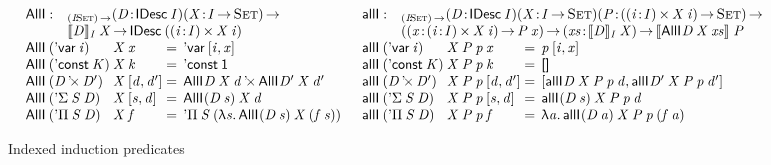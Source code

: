 \begin{figure*}

\[
\begin{array}{ll}
\stk{
\begin{array}{@{}ll}
\SYMBAllI : & _{\PI{\V{I}}{\Set}}
              \PITEL{\V{D}}{\IDesc{\V{I}}}
              \PI{\V{X}}{\V{I} \To \Set} \\
            & \idescop{\V{D}}{\V{I}}{\V{X}} \To
              \IDesc{(\SIGMA{\V{i}}{\V{I}}{\V{X}\: \V{i}})}
\end{array} \\
\begin{array}{@{}l@{}l@{\:=\:\:}l}
\AllI{\:}{(\DVar{\V{i}})}{& \V{X}}{\V{x}} &
    \DVar{\pair{\V{i}}{\V{x}}{}} \\
\AllI{\:}{(\DConst{\V{K}})}{& \V{X}}{\V{k}} &
    \DConst{\Unit} \\
\AllI{\:}{(\DProd{\V{D}}{\V{D'}})}{& \V{X}}{\pair{\V{d}}{\V{d'}}{}} &
    \DProd{\AllI{}{\V{D}}{\V{X}}{\V{d}}}{\AllI{}{\V{D'}}{\V{X}}{\V{d'}}} \\
\AllI{\:}{(\DSigma{\V{S}}{\V{D}})}{& \V{X}}{\pair{\V{s}}{\V{d}}{}} &
    \AllI{}{(\V{D}\: \V{s})}{\V{X}}{\V{d}} \\
\AllI{\:}{(\DPi{\V{S}}{\V{D}})}{& \V{X}}{\V{f}} &
    \DPi{\V{S}}{(\LAM{\V{s}} \AllI{}{(\V{D}\: \V{s})}{\V{X}}{(\V{f}\: \V{s})})}
\end{array}
}
&
\stk{
\begin{array}{@{}ll}
\SYMBallI : & _{\PI{\V{I}}{\Set}}
              \PITEL{\V{D}}{\IDesc{\V{I}}}
              \PITEL{\V{X}}{\V{I} \To \Set} 
              \PI{\V{P}}{(\SIGMA{\V{i}}{\V{I}}{\V{X}\: \V{i}}) \To \Set} \\
            & (\PI{\V{x}}{\SIGMA{\V{i}}{\V{I}}{\V{X}\: \V{i}}} \V{P}\: \V{x}) \To
              \PI{\V{xs}}{\idescop{\V{D}}{\V{I}}{\V{X}}} 
              \idescop{\AllI{}{\V{D}}{\V{X}}{\V{xs}}}{}{\V{P}}
\end{array} \\
\begin{array}{@{}l@{}l@{\:=\:\:}l}
\allI{\:}{(\DVar{\V{i}})}{& \V{X}}{\V{P}}{\V{p}}{\V{x}} &
    \V{p}\: \pair{\V{i}}{\V{x}}{} \\
\allI{\:}{(\DConst{\V{K}})}{& \V{X}}{\V{P}}{\V{p}}{\V{k}} &
    \void \\
\allI{\:}{(\DProd{\V{D}}{\V{D'}})}{& \V{X}}{\V{P}}{\V{p}}{\pair{\V{d}}{\V{d'}}{}} &
    \pair{\allI{}{\V{D}}{\V{X}}{\V{P}}{\V{p}}{\V{d}}}
         {\allI{}{\V{D'}}{\V{X}}{\V{P}}{\V{p}}{\V{d'}}}{} \\
\allI{\:}{(\DSigma{\V{S}}{\V{D}})}{& \V{X}}{\V{P}}{\V{p}}{\pair{\V{s}}{\V{d}}{}} &
    \allI{}{(\V{D}\: \V{s})}{\V{X}}{\V{P}}{\V{p}}{\V{d}} \\
\allI{\:}{(\DPi{\V{S}}{\V{D}})}{& \V{X}}{\V{P}}{\V{p}}{\V{f}} &
    \LAM{\V{a}}\allI{}{(\V{D}\: \V{a})}{\V{X}}{\V{P}}{\V{p}}{(\V{f}\: \V{a})}
\end{array}
\end{array}
}
\]

\caption{Indexed induction predicates}
\label{fig:allI-predicates}

\end{figure*}


